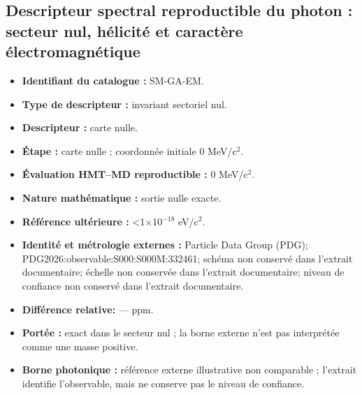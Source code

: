 \subsection{Descripteur spectral reproductible du photon : secteur nul, hélicité et caractère électromagnétique}
\begin{itemize}
\item \textbf{Identifiant du catalogue :} SM-GA-EM.
\item \textbf{Type de descripteur :} invariant sectoriel nul.
\item \textbf{Descripteur :} carte nulle.
\item \textbf{Étape :} carte nulle ; coordonnée initiale 0 MeV/c\({}^{2}\).
\item \textbf{Évaluation HMT--MD reproductible :} 0 MeV/c\({}^{2}\).
\item \textbf{Nature mathématique :} sortie nulle exacte.
\item \textbf{Référence ultérieure :} <1×10\({}^{-18}\) eV/c\({}^{2}\).
\item \textbf{Identité et métrologie externes :} Particle Data Group (PDG); PDG2026:\allowbreak{}observable:\allowbreak{}S000:\allowbreak{}S000M:\allowbreak{}332461; schéma non conservé dans l’extrait documentaire; échelle non conservée dans l’extrait documentaire; niveau de confiance non conservé dans l’extrait documentaire.
\item \textbf{Différence relative:} --- ppm.
\item \textbf{Portée :} exact dans le secteur nul ; la borne externe n’est pas interprétée comme une masse positive.
\item \textbf{Borne photonique :} référence externe illustrative non comparable ; l’extrait identifie l’observable, mais ne conserve pas le niveau de confiance.
\end{itemize}
